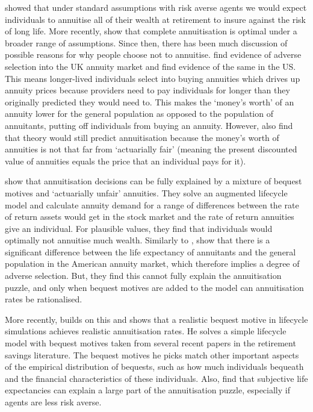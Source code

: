 \documentclass[12pt]{article}
\begin{document}
\cite{yaari_65} showed that under standard assumptions with risk averse agents
we would expect individuals to annuitise all of their wealth at retirement to
insure against the risk of long life. More recently,
\cite{davidoff_brown_diamond_aer_2005} show that complete annuitisation is
optimal under a broader range of assumptions. Since then, there has been much
discussion of possible reasons for why people choose not to annuitise.
\cite{finkelstein_porteba_2002, finkelstein_porteba_2004} find evidence of
adverse selection into the UK annuity market and \cite{mitchell_et_al_1999} find
evidence of the same in the US. This means longer-lived individuals select into
buying annuities which drives up annuity prices because providers need to pay
individuals for longer than they originally predicted they would need to. This
makes the `money's worth' of an annuity lower for the general population as
opposed to the population of annuitants, putting off individuals from buying an
annuity. However, \cite{mitchell_et_al_1999} also find that theory would still
predict annuitisation because the money's worth of annuities is not that far
from `actuarially fair' (meaning the present discounted value of annuities
equals the price that an individual pays for it).

\cite{friedman_warshawsky_qje_1990} show that annuitisation decisions can be
fully explained by a mixture of bequest motives and `actuarially unfair'
annuities. They solve an augmented lifecycle model and calculate annuity demand
for a range of differences between the rate of return assets would get in the stock
market and the rate of return annuities give an individual. For plausible values,
they find that individuals would optimally not annuitise much wealth. Similarly
to \cite{finkelstein_porteba_2004}, \cite{friedman_warshawsky_chicago_1988} show
that there is a significant difference between the life expectancy of annuitants
and the general population in the American annuity market, which therefore
implies a degree of adverse selection. But, they find this cannot fully explain
the annuitisation puzzle, and only when bequest motives are added to the model
can annuitisation rates be rationalised.

More recently, \cite{lockwood_red_2012} builds on this and shows that a
realistic bequest motive in lifecycle simulations achieves realistic
annuitisation rates. He solves a simple lifecycle model with bequest motives
taken from several recent papers in the retirement savings literature. The
bequest motives he picks match other important aspects of the empirical
distribution of bequests, such as how much individuals bequeath and the financial
characteristics of these individuals. Also, \cite{odea_sturrock_rest_2023} find
that subjective life expectancies can explain a large part of the annuitisation
puzzle, especially if agents are less risk averse.
\end{document}
